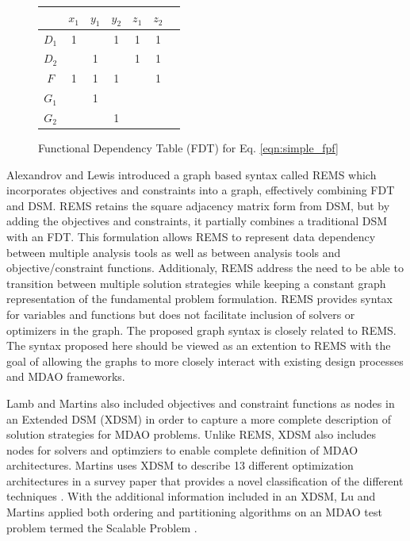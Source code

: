     \begin{figure}[htb!]
        \begin{center}
        \begin{tabular}{|c|c|c|c|c|c|c|}
            \hline
                   & $x_1$ & $y_1$ & $y_2$ & $z_1$ & $z_2$ \\ \hline
            $D_1$  & 1     &       & 1     & 1     & 1     \\ \hline
            $D_2$  &       & 1     &       & 1     & 1     \\ \hline
            $F$    & 1     & 1     & 1     &       & 1     \\ \hline
            $G_1$  &       & 1     &       &       &       \\ \hline
            $G_2$  &       &       & 1     &       &       \\
            \hline
        \end{tabular}
        \caption{Functional Dependency Table (FDT) for Eq. \ref{eqn:simple_fpf} \label{fig:FDT_simple}}
        \end{center}
    \end{figure}

    Alexandrov and Lewis introduced a graph based syntax called REMS which 
    incorporates objectives and constraints into a graph, effectively combining 
    FDT and DSM\cite{alexandrov2004}. REMS retains the square adjacency 
    matrix form from DSM, but by adding the objectives and constraints, it partially 
    combines a traditional DSM with an FDT. This formulation allows REMS to represent data 
    dependency between multiple analysis tools as well as between analysis tools and
    objective/constraint functions. Additionaly, REMS address the need to be able to 
    transition between multiple solution strategies while keeping a constant 
    graph representation of the fundamental problem formulation. REMS provides
    syntax for variables and functions but does not facilitate inclusion 
    of solvers or optimizers in the graph.  The 
    proposed graph syntax is closely related to REMS. The syntax proposed here should 
    be viewed as an extention to REMS with the goal of allowing the graphs to more 
    closely interact with existing design processes and MDAO frameworks. 

    Lamb and Martins also included objectives and constraint functions as nodes 
    in an Extended DSM (XDSM) in order to capture a more complete description 
    of solution strategies for MDAO problems\cite{Lambe2012}. Unlike REMS, 
    XDSM also includes nodes for solvers and optimziers to enable complete 
    definition of MDAO architectures. Martins uses XDSM to describe 13 different 
    optimization architectures in a survey paper that provides a novel 
    classification of the different techniques \cite{Lambe2011}. With the 
    additional information included in an XDSM, Lu and Martins applied both 
    ordering and partitioning algorithms on an MDAO test problem termed the 
    Scalable Problem \cite{Lu2012}. 

